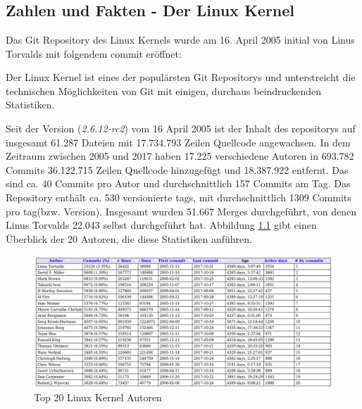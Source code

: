 \chapter{\lookout}
\label{cha:lookout}
\section{Zahlen und Fakten - Der Linux Kernel}\label{sec:kernel}
Das Git Repository des Linux Kernels wurde am 16. April 2005 initial von Linus
Torvalds mit folgendem \gls{commit}\cite{link:linuxgit} eröffnet:



Der Linux Kernel ist eines der populärsten Git Repositorys und unterstreicht
die technischen Möglichkeiten von Git mit einigen, durchaus beindruckenden
Statistiken.

Seit der Version (\textit{2.6.12-rc2}) vom 16 April 2005 ist der Inhalt des
\glspl{repository} auf insgesamt 61.287 Dateien mit 17.734.793 Zeilen Quellcode
angewachsen. In dem Zeitraum zwischen 2005 und 2017 haben 17.225 verschiedene
Autoren in 693.782 Commits 36.122.715 Zeilen Quellcode hinzugefügt und
18.387.922 entfernt. Das sind ca. 40 Commits pro Autor und durchschnittlich
157 Commits am Tag. Das Repository enthält ca. 530 versionierte \glspl{tag},
mit durchschnittlich 1309 Commits pro \gls{tag}(bzw. Version). Insgesamt wurden
51.667 Merges durchgeführt, von denen Linus Torvalds 22.043 selbst durchgeführt
hat. Abbildung \ref{top20} gibt einen Überblick der 20 Autoren, die diese
Statistiken anführen.

\begin{figure}
	\centering
  \includegraphics[scale=0.40]{images/top_20_of_linux_authors.png}
	\caption{Top 20 Linux Kernel Autoren}
	\label{top20}
\end{figure}


